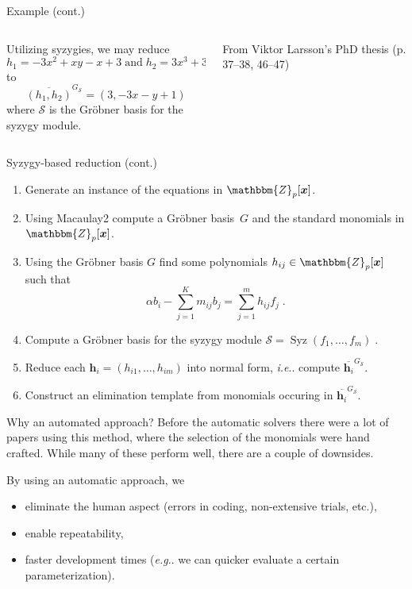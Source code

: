 \documentclass[aspectratio=169]{beamer}
\makeatletter
\newcommand{\mat}[1]{\bm{#1}}
\newcommand{\Z}{\ensuremath{\mathbbm{Z}}}
\DeclareRobustCommand\eg{\emph{e.g}\@ifnextchar.{}{.\@}}
\DeclareRobustCommand\ie{\emph{i.e}\@ifnextchar.{}{.\@}}
\DeclareMathOperator{\syz}{Syz}
\makeatother
\begin{document}
\begin{frame}[t]{Example (cont.)}
\vspace{3mm}
\begin{columns}
    \begin{column}{0.7\textwidth}
        Utilizing syzygies, we may reduce 
        \[
            h_1=-3x^2+xy-x+3 \;\text{and}\; h_2 = 3x^3+3xy^2+x-y+1
        \]
        to
        \[
            \overline{(h_1,h_2)}^{G_\mathcal{S}}=(3,-3x-y+1)
        \]
        where $\mathcal{S}$ is the Gröbner basis for the syzygy module.
    \end{column}%
    \begin{column}{0.3\textwidth}
        \centering
        

        \vspace{5mm}

        {\scriptsize From Viktor Larsson's PhD thesis (p. 37--38, 46--47)}
    \end{column}
\end{columns}
\end{frame}


\iftrue
\begin{frame}[t]{Syzygy-based reduction (cont.)}
\begin{enumerate}
\item Generate an instance of the equations in $\Z_p[\mat{x}]$.
\item Using Macaulay2 compute a Gröbner basis~$G$ and the standard monomials in $\Z_p[\mat{x}]$.
\item Using the Gröbner basis $G$ find some polynomials $h_{ij}\in\Z_p[\mat{x}]$ such that
\[
    \alpha b_i- \sum_{j=1}^K m_{ij}b_j = \sum_{j=1}^mh_{ij}f_j\;.
\]
\item Compute a Gröbner basis for the syzygy module
$
    \mathcal{S} = \syz(f_1,\ldots,f_m)\;.
$
\item Reduce each $\mat{h}_i=(h_{i1},\ldots,h_{im})$ into normal form, \ie{} compute $\overline{\mat{h}_i}^{G_{\mathcal{S}}}$.
\item Construct an elimination template from monomials occuring in $\overline{\mat{h}_i}^{G_{\mathcal{S}}}$.
\end{enumerate}
\end{frame}
\fi

\begin{frame}{Why an automated approach?}
Before the automatic solvers there were a lot of papers using this method, where the selection of the monomials were hand crafted. While many of these perform well, there are a couple of downsides.

By using an automatic approach, we
\begin{itemize}
\item eliminate the human aspect (errors in coding, non-extensive trials, etc.),
\item enable repeatability,
\item faster development times (\eg{} we can quicker evaluate a certain parameterization).
\end{itemize}
\end{frame}
\end{document}
